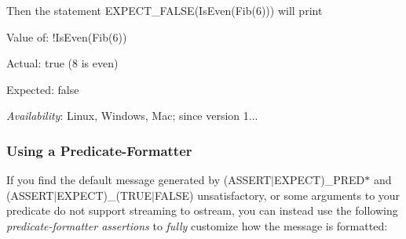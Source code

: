 Then the statement {\ttfamily E\+X\+P\+E\+C\+T\+\_\+\+F\+A\+L\+SE(Is\+Even(\+Fib(6)))} will print


\begin{DoxyPre}
Value of: !IsEven(Fib(6))~\newline

Actual: true (8 is even)~\newline

Expected: false~\newline

\end{DoxyPre}


{\itshape Availability}\+: Linux, Windows, Mac; since version 1...

\subsubsection*{Using a Predicate-\/\+Formatter}

If you find the default message generated by {\ttfamily (A\+S\+S\+E\+R\+T$\vert$\+E\+X\+P\+E\+CT)\+\_\+\+P\+R\+E\+D$\ast$} and {\ttfamily (A\+S\+S\+E\+R\+T$\vert$\+E\+X\+P\+E\+CT)\+\_\+(T\+R\+U\+E$\vert$\+F\+A\+L\+SE)} unsatisfactory, or some arguments to your predicate do not support streaming to {\ttfamily ostream}, you can instead use the following {\itshape predicate-\/formatter assertions} to {\itshape fully} customize how the message is formatted\+:

